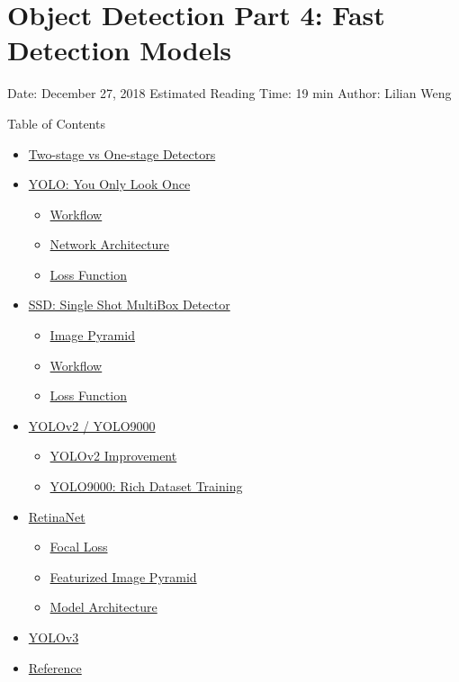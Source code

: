 \section{Object Detection Part 4: Fast Detection Models}\label{object-detection-part-4-fast-detection-models}

Date: December 27, 2018 \textbar{} Estimated Reading Time: 19 min \textbar{} Author: Lilian Weng

{Table of Contents}

\begin{itemize}
\tightlist
\item
  \hyperref[two-stage-vs-one-stage-detectors]{Two-stage vs One-stage Detectors}
\item
  \hyperref[yolo-you-only-look-once]{YOLO: You Only Look Once}

  \begin{itemize}
  \tightlist
  \item
    \hyperref[workflow]{Workflow}
  \item
    \hyperref[network-architecture]{Network Architecture}
  \item
    \hyperref[loss-function]{Loss Function}
  \end{itemize}
\item
  \hyperref[ssd-single-shot-multibox-detector]{SSD: Single Shot MultiBox Detector}

  \begin{itemize}
  \tightlist
  \item
    \hyperref[image-pyramid]{Image Pyramid}
  \item
    \hyperref[workflow-1]{Workflow}
  \item
    \hyperref[loss-function-1]{Loss Function}
  \end{itemize}
\item
  \hyperref[yolov2--yolo9000]{YOLOv2 / YOLO9000}

  \begin{itemize}
  \tightlist
  \item
    \hyperref[yolov2-improvement]{YOLOv2 Improvement}
  \item
    \hyperref[yolo9000-rich-dataset-training]{YOLO9000: Rich Dataset Training}
  \end{itemize}
\item
  \hyperref[retinanet]{RetinaNet}

  \begin{itemize}
  \tightlist
  \item
    \hyperref[focal-loss]{Focal Loss}
  \item
    \hyperref[featurized-image-pyramid]{Featurized Image Pyramid}
  \item
    \hyperref[model-architecture]{Model Architecture}
  \end{itemize}
\item
  \hyperref[yolov3]{YOLOv3}
\item
  \hyperref[reference]{Reference}
\end{itemize}

